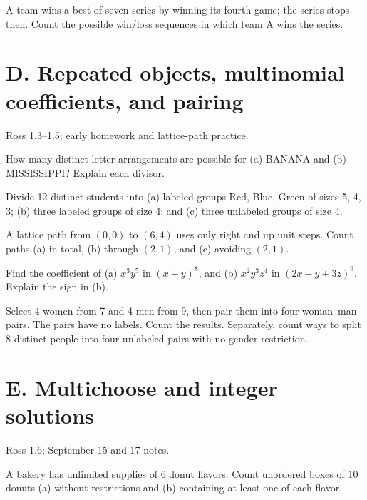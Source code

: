 \documentclass[11pt]{article}
\newcommand{\qid}[1]{\par\needspace{5\baselineskip}\noindent{\color{accent}\bfseries #1}\quad}
\newcommand{\source}[1]{{\small\color{muted}#1}\par}
\begin{document}
\qid{C5} A team wins a best-of-seven series by winning its fourth game; the series stops then. Count the possible win/loss sequences in which team A wins the series.
\par\vspace{0.40in}


\clearpage
\section*{D. Repeated objects, multinomial coefficients, and pairing}
\source{Ross 1.3--1.5; early homework and lattice-path practice.}
\qid{D1} How many distinct letter arrangements are possible for (a) BANANA and (b) MISSISSIPPI? Explain each divisor.
\par\vspace{0.40in}

\qid{D2} Divide 12 distinct students into (a) labeled groups Red, Blue, Green of sizes 5, 4, 3; (b) three labeled groups of size 4; and (c) three unlabeled groups of size 4.
\par\vspace{0.40in}

\qid{D3} A lattice path from \((0,0)\) to \((6,4)\) uses only right and up unit steps. Count paths (a) in total, (b) through \((2,1)\), and (c) avoiding \((2,1)\).
\par\vspace{0.40in}

\qid{D4} Find the coefficient of (a) \(x^3y^5\) in \((x+y)^8\), and (b) \(x^2y^3z^4\) in \((2x-y+3z)^9\). Explain the sign in (b).
\par\vspace{0.40in}

\qid{D5} Select 4 women from 7 and 4 men from 9, then pair them into four woman--man pairs. The pairs have no labels. Count the results. Separately, count ways to split 8 distinct people into four unlabeled pairs with no gender restriction.
\par\vspace{0.40in}


\clearpage
\section*{E. Multichoose and integer solutions}
\source{Ross 1.6; September 15 and 17 notes.}
\qid{E1} A bakery has unlimited supplies of 6 donut flavors. Count unordered boxes of 10 donuts (a) without restrictions and (b) containing at least one of each flavor.
\par\vspace{0.40in}
\end{document}

